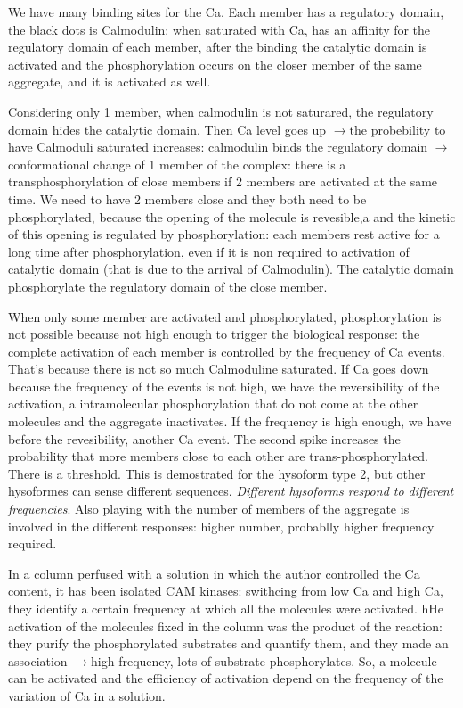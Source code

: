 \documentclass[a4paper, 12pt]{book}
\newcommand{\lfreccia}{\ensuremath{\longrightarrow}}
\begin{document}
We have many binding sites for the Ca. Each member has a regulatory domain, the black dots is Calmodulin: when saturated with Ca, has an affinity for the regulatory domain of each member, after the binding the catalytic domain is activated and the phosphorylation occurs on the closer member of the same aggregate, and it is activated as well.

Considering only 1 member, when calmodulin is not saturared, the regulatory domain hides the catalytic domain. Then Ca level goes up \lfreccia the probebility to have Calmoduli saturated increases: calmodulin binds the regulatory domain \lfreccia conformational change of 1 member of the complex: there is a transphosphorylation of close members if 2 members are activated at the same time.  We need to have 2 members close and they both need to be phosphorylated, because the opening of the molecule is revesible,a and the kinetic of this opening is regulated by phosphorylation: each members rest active for a long time after phosphorylation, even if it is non required to activation of catalytic domain (that is due to the arrival of Calmodulin). The catalytic domain phosphorylate the regulatory domain of the close member.

When only some member are activated and phosphorylated, phosphorylation is  not possible  because not high enough to trigger the biological response: the complete activation of each member is controlled by the frequency of Ca events. That's because there is not so much Calmoduline saturated. If Ca goes down because the frequency of the events is not high, we have the reversibility of the activation, a intramolecular phosphorylation that do not come at the other molecules and the aggregate inactivates. If the frequency is high enough, we have before the revesibility, another Ca event. The second spike increases the probability that more members close to each other are trans-phosphorylated. There is a threshold. This is demostrated for the hysoform type 2, but other hysoformes can sense different sequences. \emph{Different hysoforms respond  to different frequencies}. Also playing with the number of members of the aggregate is involved in the different responses: higher number, probablly higher frequency required.

In a column perfused with a solution in which the author controlled the Ca content, it has been isolated  CAM kinases: swithcing from low Ca and high Ca, they identify a certain frequency at which all the molecules were activated. hHe activation of the molecules fixed in the column was the product of the reaction: they purify the phosphorylated substrates and quantify them, and they made an association \lfreccia high frequency, lots of substrate phosphorylates. So,  a molecule can be activated and the efficiency of activation depend on the frequency of the variation of Ca in a solution.
\end{document}
